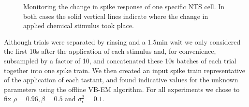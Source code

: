 \documentclass[12pt]{article}
\begin{document}
\begin{figure}[h] \begin{center}

 \caption{Monitoring the change in spike response of one specific NTS cell. In both
 cases the solid vertical lines indicate where the change in applied chemical stimulus took place.}
 \label{fig:tastants} \end{center} \end{figure}

Although trials were separated by rinsing and a 1.5min wait we only considered the first 10s after the application of each stimulus and, for convenience, subsampled by a factor of 10, and concatenated these 10s batches of each trial together into one spike train. We then created an input spike train representative of the application of each tastant, and found indicative values for the unknown parameters using the offline VB-EM algorithm.  For all experiments we chose to fix $\rho = 0.96, \beta = 0.5$ and $\sigma^2_\epsilon = 0.1$.
\end{document}
